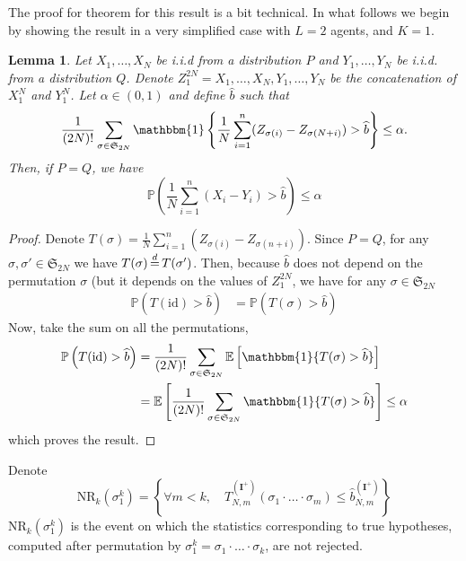 \documentclass{article}
\theoremstyle{plain}
\newtheorem{Lemma}{Lemma}
\theoremstyle{remark}
\renewcommand{\P}{\mathbb{P}}
\newcommand{\E}{\mathbb{E}}
\renewcommand{\S}{\mathfrak{S}}
\newcommand{\1}{\mathbbm{1}}
\newcommand{\id}{\mathrm{id}}
\newcommand{\dec}{\,{\buildrel d \over =}\,}
\numberwithin{equation}{section}
\begin{document}
 The proof for theorem for this result is a bit technical. In what follows we begin by showing the result in a very simplified case with $L=2$ agents, and $K=1$.
\begin{Lemma}\label{lem:quantile_permu_2}
  Let $X_1,\dots,X_N$ be i.i.d from a distribution $P$ and $Y_1,\dots,Y_N$ be i.i.d. from a distribution $Q$. Denote $Z_1^{2N}=X_1,\dots,X_N,Y_1,\dots,Y_N$ be the concatenation of $X_1^N$ and $Y_1^N$. Let $\alpha \in (0,1)$ and define $\widehat{b}$ such that 
  $$ \frac{1}{(2N)!}\sum_{\sigma\in \S_{2N}} \1\left\{ \frac{1}{N}\sum_{i=1}^n (Z_{\sigma(i)}-Z_{\sigma(N+i)}) > \widehat{b}\right\}\le \alpha.$$
  Then, if $P=Q$, we have 
  $$\P\left(\frac{1}{N}\sum_{i=1}^n (X_i-Y_i) >\widehat{b} \right)\le \alpha $$ 
\end{Lemma}
\begin{proof}
  Denote $T(\sigma)= \frac{1}{N}\sum_{i=1}^n (Z_{\sigma(i)}-Z_{\sigma(n+i)})$. Since $P=Q$, for any $\sigma,\sigma' \in \S_{2N}$ we have $T(\sigma)\dec T(\sigma')$. Then, because $\widehat{b}$ does not depend on the permutation $\sigma$ (but it depends on the values of $Z_1^{2N}$, we have for any $\sigma \in \S_{2N}$
  \begin{align*}
    \P\left(T(\id)> \widehat{b}\right)&=\P\left(T(\sigma)> \widehat{b}\right)
  \end{align*} 
  Now, take the sum on all the permutations, 
  \begin{align*}
    \P\left(T(\id)> \widehat{b}\right)&=\frac{1}{(2N)!}\sum_{\sigma\in \S_{2N}} \E\left[\1\{T(\sigma)> \widehat{b}\}\right]\\
                                      &=  \E\left[\frac{1}{(2N)!}\sum_{\sigma\in \S_{2N}}\1\{T(\sigma)> \widehat{b}\}\right]\le \alpha
  \end{align*}
  which proves the result.
\end{proof}

Denote 
$$\mathrm{NR}_k(\sigma_1^k) = \left\{\forall m < k,\quad  T_{N,m}^{(\textbf{I}^+)}(\sigma_1\cdot\ldots\cdot\sigma_m) \le   \widehat{b}_{N,m}^{(\textbf{I}^+)}\right\}$$
$\mathrm{NR}_k(\sigma_1^k)$ is the event on which the statistics corresponding to true hypotheses, computed after permutation by $\sigma_1^k=\sigma_1\cdot \ldots \cdot \sigma_k$, are not rejected.
\end{document}
